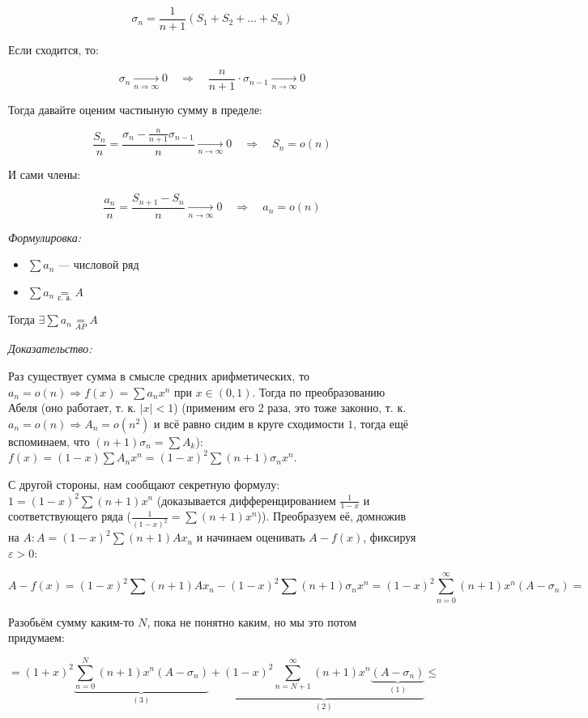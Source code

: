 \documentclass{article}
\def\eqby#1{\underset{#1}{=}}
\begin{document}
\[\sigma_n = \frac{1}{n + 1}(S_1 + S_2 + \ldots + S_n)\]

Если сходится, то:

\[\sigma_n \underset{n \Longrightarrow \infty}{\longrightarrow} 0 \quad \Rightarrow \quad \frac{n}{n + 1} \cdot \sigma_{n - 1} \underset{n \rightarrow \infty}{\longrightarrow} 0\]

Тогда давайте оценим частиыную сумму в пределе:

\[\frac{S_n}{n} = \frac{\sigma_n - \frac{n}{n + 1}\sigma_{n - 1}}{n} \underset{n \rightarrow \infty}{\longrightarrow} 0 \quad \Longrightarrow \quad S_n = o(n)\]

И сами члены:

\[\frac{a_n}{n} = \frac{S_{n + 1} - S_{n}}{n} \underset{n \rightarrow \infty}{\longrightarrow} 0 \quad \Longrightarrow \quad a_n = o(n)\]

\textit{Формулировка:}

\begin{itemize}
    \item $\sum a_n$ --- числовой ряд
    \item $\sum a_n \eqby{\text{с. а.}} A$
\end{itemize}

Тогда $\exists \sum a_n \eqby{AP} A$

\textit{Доказательство:}

Раз существует сумма в смысле средних арифметических, то $a_n = o(n) \Rightarrow f(x) = \sum a_n x^n$ при $x \in (0, 1)$. Тогда по преобразованию Абеля (оно работает, т. к. $|x| < 1$) (применим его 2 раза, это тоже законно, т. к. $a_n = o(n) \Rightarrow A_n = o(n^2)$ и всё равно сидим в круге сходимости $1$, тогда ещё вспоминаем, что $(n + 1)\sigma_n = \sum A_k$): $f(x) = (1 - x)\sum A_n x^n = (1 - x)^2\sum (n + 1)\sigma_n x^n$. 

С другой стороны, нам сообщают секретную формулу: $1 = (1 - x)^2\sum(n + 1)x^n$ (доказывается дифференцированием $\frac{1}{1 - x}$ и соответствующего ряда ($\frac{1}{(1 - x)^2} = \sum (n + 1)x^n$)). Преобразуем её, домножив на $A: A = (1 - x)^2\sum (n + 1)A x_n$ и начинаем оценивать $A - f(x)$, фиксируя $\varepsilon > 0$:

\[A - f(x) = (1 - x)^2\sum (n + 1)A x_n - (1 - x)^2\sum (n + 1)\sigma_n x^n = (1 - x)^2\sum_{n = 0}^{\infty} (n + 1) x^n (A - \sigma_n) = \]

Разобьём сумму каким-то $N$, пока не понятно каким, но мы это потом придумаем: 

\[= (1 + x)^2 \underbrace{\sum_{n = 0}^{N} (n + 1) x^n (A - \sigma_n)}_{(3)} + \underbrace{(1 - x)^2 \sum_{n = N + 1}^{\infty} (n + 1) x^n \underbrace{(A - \sigma_n)}_{(1)}}_{(2)} \le \]
\end{document}
